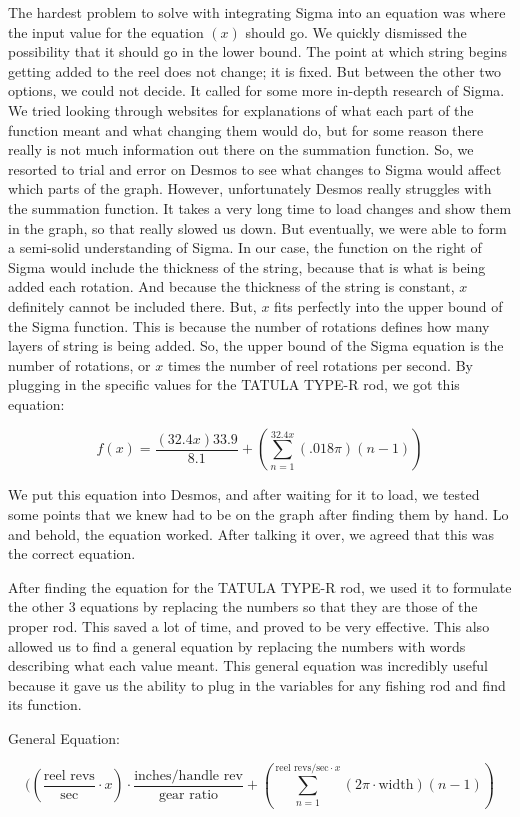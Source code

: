 The hardest problem to solve with integrating Sigma into an equation was where the input value for the equation $(x)$ should go. We quickly dismissed the possibility that it should go in the lower bound. The point at which string begins getting added to the reel does not change; it is fixed. But between the other two options, we could not decide. It called for some more in-depth research of Sigma. We tried looking through websites for explanations of what each part of the function meant and what changing them would do, but for some reason there really is not much information out there on the summation function. So, we resorted to trial and error on Desmos to see what changes to Sigma would affect which parts of the graph. However, unfortunately Desmos really struggles with the summation function. It takes a very long time to load changes and show them in the graph, so that really slowed us down. But eventually, we were able to form a semi-solid understanding of Sigma. In our case, the function on the right of Sigma would include the thickness of the string, because that is what is being added each rotation. And because the thickness of the string is constant, $x$ definitely cannot be included there. But, $x$ fits perfectly into the upper bound of the Sigma function. This is because the number of rotations defines how many layers of string is being added. So, the upper bound of the Sigma equation is the number of rotations, or $x$ times the number of reel rotations per second. By plugging in the specific values for the TATULA TYPE-R rod, we got this equation:

$$f(x) = \frac{(32.4x)33.9}{8.1} + (\sum_{n=1}^{32.4x} (.018\pi)(n-1))
$$

We put this equation into Desmos, and after waiting for it to load, we tested some points that we knew had to be on the graph after finding them by hand. Lo and behold, the equation worked. After talking it over, we agreed that this was the correct equation.

After finding the equation for the TATULA TYPE-R rod, we used it to formulate the other 3 equations by replacing the numbers so that they are those of the proper rod. This saved a lot of time, and proved to be very effective. This also allowed us to find a general equation by replacing the numbers with words describing what each value meant. This general equation was incredibly useful because it gave us the ability to plug in the variables for any fishing rod and find its function.


\begin{center}
\caption{General Equation:}
\end{center}
$$((\frac{\text{reel revs}}{\text{sec}} \cdot x) \cdot \frac{\text{inches/handle rev}}{\text{gear ratio}} + (\sum_{n=1}^{\text{reel revs/sec} \cdot x} (2\pi \cdot \text{width})(n-1))
$$




